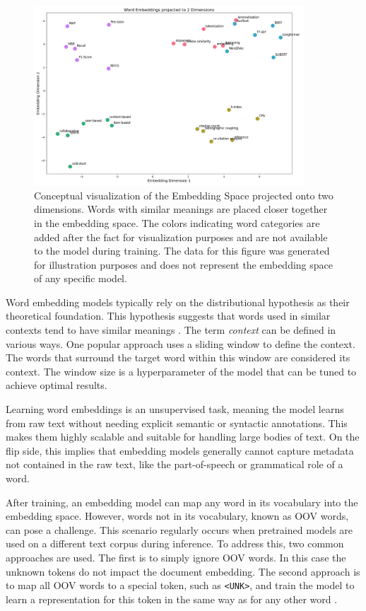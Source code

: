 \begin{figure}[ht]
    \centering
    \includegraphics[width=0.9\textwidth]{plots/word_embeddings.png}
    \caption[The Embedding Space]{Conceptual visualization of the Embedding Space projected onto two dimensions. Words with similar meanings are placed closer together in the embedding space. The colors indicating word categories are added after the fact for visualization purposes and are not available to the model during training. The data for this figure was generated for illustration purposes and does not represent the embedding space of any specific model.}
    \label{fig:word-embeddings}
\end{figure}

Word embedding models typically rely on the distributional hypothesis \cite{HarrisDistributionalStructure1954} as their theoretical foundation. This hypothesis suggests that words used in similar contexts tend to have similar meanings \cite{JurafskySpeechLanguage2022}. The term \emph{context} can be defined in various ways. One popular approach uses a sliding window to define the context. The words that surround the target word within this window are considered its context. The window size is a hyperparameter of the model that can be tuned to achieve optimal results.

Learning word embeddings is an unsupervised task, meaning the model learns from raw text without needing explicit semantic or syntactic annotations. This makes them highly scalable and suitable for handling large bodies of text. On the flip side, this implies that embedding models generally cannot capture metadata not contained in the raw text, like the part-of-speech or grammatical role of a word.

After training, an embedding model can map any word in its vocabulary into the embedding space. However, words not in its vocabulary, known as \ac{OOV} words, can pose a challenge. This scenario regularly occurs when pretrained models are used on a different text corpus during inference. To address this, two common approaches are used. The first is to simply ignore \ac{OOV} words. In this case the unknown tokens do not impact the document embedding. The second approach is to map all \ac{OOV} words to a special token, such as \texttt{<UNK>}, and train the model to learn a representation for this token in the same way as for any other word \cite{JurafskySpeechLanguage2022}.

